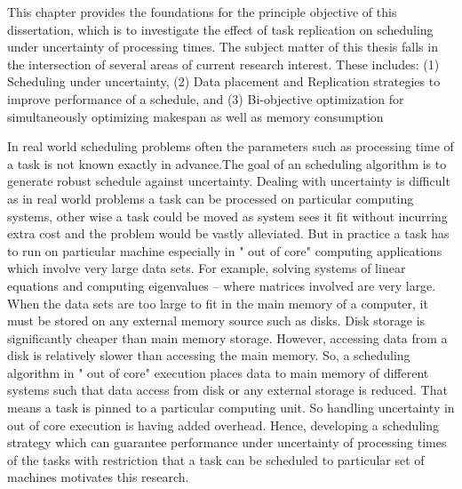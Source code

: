 \label{ch1}


This chapter provides the foundations for the principle objective of this dissertation,
which is to investigate the effect of task replication on scheduling under uncertainty of processing times.  The subject matter of this thesis falls in the intersection of several areas of current research interest.  These includes: (1)  Scheduling under uncertainty, (2) Data placement and Replication strategies to improve performance of a schedule, and (3) Bi-objective optimization for simultaneously optimizing makespan as well as memory consumption


In real world scheduling problems often the parameters such as processing time of a task is not known exactly in advance.The goal of an scheduling algorithm is to generate robust schedule against uncertainty. Dealing with uncertainty is difficult as in real world problems a task can be processed on particular computing systems, other wise a task could be moved as system sees it fit without incurring extra cost and the problem would be vastly alleviated. But in practice a task has to run on particular machine especially in " out of core" computing applications which involve very large data sets. For example, solving systems of linear equations and computing eigenvalues – where matrices involved are very large. When the data sets are too large to fit in the main memory of a computer, it must be stored on any external memory source such as disks. Disk storage is significantly cheaper than main memory storage. However, accessing data from a disk is relatively slower than accessing the main memory. So, a scheduling algorithm in " out of core" execution places data to main memory of different systems such that data access from disk or any external storage is reduced. That means a task is pinned to a particular computing unit. So handling uncertainty in out of core execution is having added overhead. Hence, developing a scheduling strategy which can guarantee performance under uncertainty of processing times of the tasks with restriction that a task can be scheduled to particular set of machines motivates this research.

